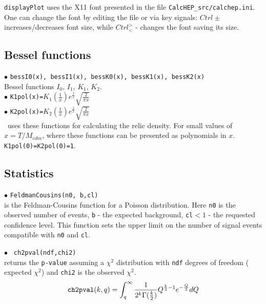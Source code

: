 \documentclass[12pt,a4paper]{article}
\begin{document}
{\tt displayPlot} uses the X11 font presented in the  file {\tt CalcHEP\_src/calchep.ini}. One can change the font by editing the file or via key signals:
$ Ctrl\pm$ increases/decreases font size, while $ Ctrl{}^>_<$ - changes the font saving   its size.  



\subsection{Bessel functions}

\noindent$\bullet$ \verb|bessI0(x), bessI1(x), bessK0(x), bessK1(x), bessK2(x) |\\
 Bessel functions $I_0$, $I_1$, $K_1$, $K_2$.\\ 

\noindent$\bullet$ \verb|K1pol(x)=|$K_1(\frac{1}{x}) e^\frac{1}{x}
\sqrt{\frac{2}{\pi x}}$  \\
\noindent$\bullet$ \verb|K2pol(x)=|$K_2(\frac{1}{x}) e^\frac{1}{x}
\sqrt{\frac{2}{\pi x}}$   \\
\micro\ uses these functions for calculating the  relic density. For 
small values of $x=T/M_{cdm}$, where these functions can be presented as polynomials in $x$.
\verb|K1pol(0)=K2pol(0)=1|. 

\subsection{Statistics}
\noindent$\bullet$ \verb|FeldmanCousins(n0, b,cl)|\\
is the Feldman-Cousins \cite{Feldman:1997qc}  function for a Poisson distribution.
Here {\tt n0} is the observed number of events, {\tt b} -  the expected background,
\verb|cl|$ < 1 $ - the requested confidence level. This function sets the upper limit on the number 
of signal events compatible with {\tt n0}  and {\tt cl}.

\noindent$\bullet$ \verb| ch2pval(ndf,chi2)|\\ 
returns the {\tt p-value} assuming a $\chi^2$ distribution with  {\tt ndf} degrees
of freedom ( expected  $\chi^2$) and {\tt chi2} is the observed $\chi^2$.  
$$   
{  \verb|ch2pval|(k,q)=\int_q^\infty  \frac{1}{2^k \Gamma(\frac{k}{2})} Q^{\frac{k}{2}-1}
e^{-\frac{Q}{2}} dQ } $$   
\end{document}
